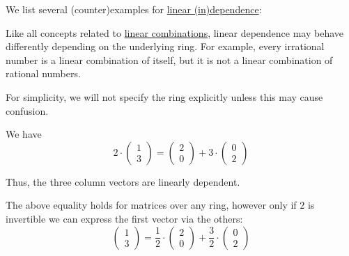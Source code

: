 \begin{example}\label{ex:def:linear_dependence}
  We list several (counter)examples for \hyperref[def:linear_dependence]{linear (in)dependence}:
  \begin{thmenum}
     Like all concepts related to \hyperref[rem:linear_combinations]{linear combinations}, linear dependence may behave differently depending on the underlying ring. For example, every irrational number is a linear combination of itself, but it is not a linear combination of rational numbers.

    For simplicity, we will not specify the ring explicitly unless this may cause confusion.

     We have
    \begin{equation*}
      2 \cdot
      \begin{pmatrix}
        1 \\ 3
      \end{pmatrix}
      =
      \begin{pmatrix}
        2 \\ 0
      \end{pmatrix}
      +
      3 \cdot
      \begin{pmatrix}
        0 \\ 2
      \end{pmatrix}
    \end{equation*}

    Thus, the three column vectors are linearly dependent.

    The above equality holds for matrices over any ring, however only if \( 2 \) is invertible we can express the first vector via the others:
    \begin{equation*}
      \begin{pmatrix}
        1 \\ 3
      \end{pmatrix}
      =
      \frac 1 2 \cdot
      \begin{pmatrix}
        2 \\ 0
      \end{pmatrix}
      +
      \frac 3 2 \cdot
      \begin{pmatrix}
        0 \\ 2
      \end{pmatrix}
    \end{equation*}
  \end{thmenum}
\end{example}

